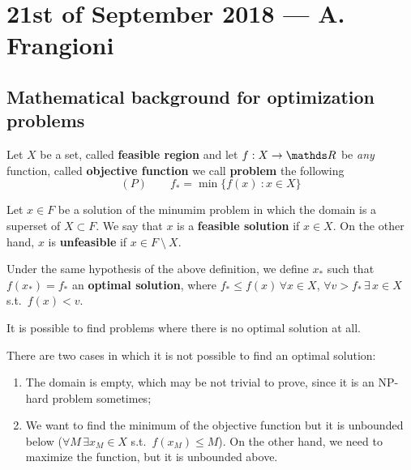 \documentclass[computationalMathematics.tex]{subfiles}
\begin{document}
\section{21st of September 2018 --- A. Frangioni}

\subsection{Mathematical background for optimization problems}

\begin{definition}\label{def:min_prob}
  Let $X$ be a set, called \textbf{feasible region} and let $f : X \to \R$ be \emph{any} function, called \textbf{objective function} we call \textbf{problem} the following
\[
  (P) \qquad f_* = \min \{f(x)~:x \in X\}
\]
\end{definition}


\begin{definition}
  Let $x \in F$ be a solution of the minumim problem in which the domain is a superset of $X \subset F$. 
  We say that $x$ is a \textbf{feasible solution} if $x \in X$.
  On the other hand, $x$ is \textbf{unfeasible} if $x \in F~\setminus~X$.
\end{definition}

\begin{definition}
  Under the same hypothesis of the above definition, we define $x_*$ such that $f(x_*) = f_*$ an \textbf{optimal solution}, where $f_* \leq f(x) \, \forall x \in X$, $\forall v > f_* \, \exists \, x \in X$ s.t.~$f(x) < v$.
\end{definition}

It is possible to find problems where there is no optimal solution at all.

\begin{example}
  There are two cases in which it is not possible to find an optimal solution:
  \begin{enumerate}
    \item The domain is empty, which may be not trivial to prove, since it is an NP-hard problem sometimes;
    \item We want to find the minimum of the objective function but it is unbounded below ($\forall M \, \exists x_M \in X$
      s.t.~$f(x_M) \leq M$).
      On the other hand, we need to maximize the function, but it is unbounded above.
  \end{enumerate}
\end{example}
\end{document}
